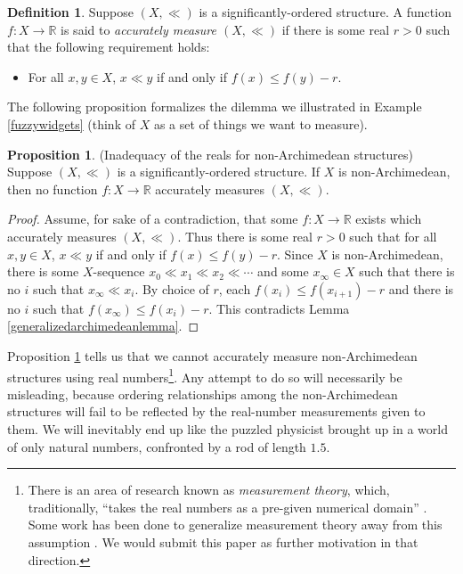 \documentclass[reqno]{article}
\theoremstyle{definition}
\newtheorem{proposition}[theorem]{Proposition}
\newtheorem{definition}{Definition}
\begin{document}
\begin{definition}
    Suppose $(X,\ll)$ is a significantly-ordered structure.
    A function $f:X\to\mathbb R$ is said to \emph{accurately measure $(X,\ll)$}
    if there is some real $r>0$ such that the following requirement holds:
    \begin{itemize}
        \item
        For all $x,y\in X$, $x\ll y$ if and only if
        $f(x)\leq f(y)-r$.
    \end{itemize}
\end{definition}

The following proposition formalizes the dilemma we illustrated in
Example \ref{fuzzywidgets} (think of $X$ as a set of things we
want to measure).

\begin{proposition}
\label{maindilemma}
(Inadequacy of the reals for non-Archimedean structures)
    Suppose $(X,\ll)$ is a significantly-ordered structure.
    If $X$ is non-Archimedean, then no function $f:X\to\mathbb R$
    accurately measures $(X,\ll)$.
\end{proposition}

\begin{proof}
    Assume, for sake of a contradiction, that some $f:X\to\mathbb R$
    exists which accurately measures $(X,\ll)$. Thus there is some real $r>0$ such that
    for all $x,y\in X$, $x\ll y$ if and only if $f(x)\leq f(y)-r$.
    Since $X$ is non-Archimedean, there is some $X$-sequence
    $x_0\ll x_1\ll x_2\ll\cdots$ and some $x_\infty\in X$
    such that there is no $i$ such that $x_\infty\ll x_i$.
    By choice of $r$, each $f(x_{i})\leq f(x_{i+1})-r$ and there is no
    $i$ such that $f(x_\infty)\leq f(x_i)-r$.
    This contradicts Lemma \ref{generalizedarchimedeanlemma}.
\end{proof}

Proposition \ref{maindilemma} tells us that we cannot accurately measure
non-Archimedean structures using real numbers\footnote{There is an area of research
known as \emph{measurement theory}, which, traditionally,
``takes the real numbers as a pre-given numerical domain'' \cite{niederee1992numbers}.
Some work has been done to generalize measurement theory away from this assumption
\cite{narens1974} \cite{skala1975} \cite{rizza2016divergent}.
We would submit this paper as further motivation in that direction.}.
Any attempt to do so will necessarily be misleading, because ordering
relationships among the non-Archimedean structures will fail to be reflected
by the real-number measurements given to them.
We will inevitably end up like the puzzled physicist
brought up in a world of only natural numbers, confronted by a rod of
length $1.5$.
\end{document}
